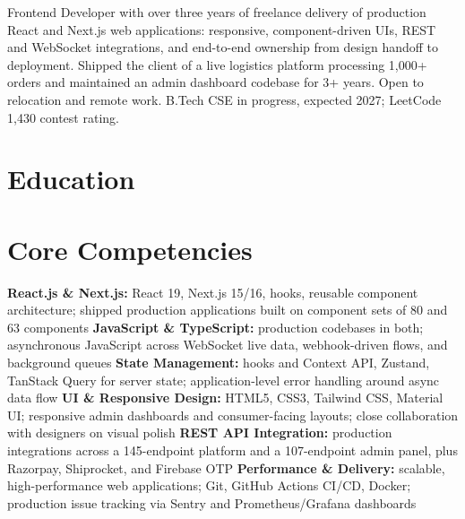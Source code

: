 \documentclass[11pt,a4paper,sans]{moderncv}
\begin{document}
\makecvtitle


\vspace{4pt}
\small{Frontend Developer with over three years of freelance delivery of production React and Next.js web applications: responsive, component-driven UIs, REST and WebSocket integrations, and end-to-end ownership from design handoff to deployment. Shipped the client of a live logistics platform processing 1,000+ orders and maintained an admin dashboard codebase for 3+ years. Open to relocation and remote work. B.Tech CSE in progress, expected 2027; LeetCode 1,430 contest rating.}


\section{Education}
\vspace{1pt}


\section{Core Competencies}
\vspace{1pt}
\raggedright
\textbf{React.js \& Next.js:} React 19, Next.js 15/16, hooks, reusable component architecture; shipped production applications built on component sets of 80 and 63 components \textbar{}
\textbf{JavaScript \& TypeScript:} production codebases in both; asynchronous JavaScript across WebSocket live data, webhook-driven flows, and background queues \textbar{}
\textbf{State Management:} hooks and Context API, Zustand, TanStack Query for server state; application-level error handling around async data flow \textbar{}
\textbf{UI \& Responsive Design:} HTML5, CSS3, Tailwind CSS, Material UI; responsive admin dashboards and consumer-facing layouts; close collaboration with designers on visual polish \textbar{}
\textbf{REST API Integration:} production integrations across a 145-endpoint platform and a 107-endpoint admin panel, plus Razorpay, Shiprocket, and Firebase OTP \textbar{}
\textbf{Performance \& Delivery:} scalable, high-performance web applications; Git, GitHub Actions CI/CD, Docker; production issue tracking via Sentry and Prometheus/Grafana dashboards
\par\normalfont
\end{document}
